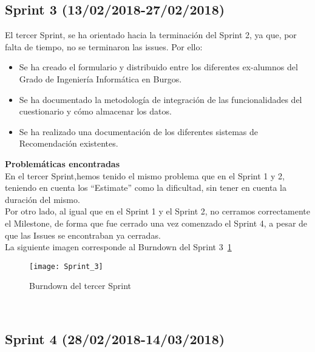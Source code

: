 \subsection{\textbf{Sprint 3}  (13/02/2018-27/02/2018) }
El tercer Sprint, se ha orientado hacia la terminación del Sprint 2, ya que, por falta de tiempo, no se terminaron las issues. 
Por ello: 
\begin{itemize}
\item Se ha creado el formulario y distribuido entre los diferentes ex-alumnos del Grado de Ingeniería Informática en Burgos. 
\item Se ha documentado la metodología de integración de las funcionalidades del cuestionario y cómo almacenar los datos. 
\item Se ha realizado una documentación de los diferentes sistemas de Recomendación existentes.  
\end{itemize}
\textbf{Problemáticas encontradas}\\En el tercer Sprint,hemos tenido el mismo problema que en el Sprint 1 y 2, teniendo en cuenta los ``Estimate'' como la dificultad, sin tener en cuenta la duración del mismo.\\Por otro lado, al igual que en el Sprint 1 y el Sprint 2, no cerramos correctamente el Milestone, de forma que fue cerrado una vez comenzado el Sprint 4, a pesar de que las Issues se encontraban ya cerradas. \\La siguiente imagen corresponde al Burndown del Sprint 3~\ref{fig:A.2.3}
\begin{figure}[h]
\centering
\texttt{[image: Sprint\_3]}
\caption{Burndown del tercer Sprint}
\label{fig:A.2.3}
\end{figure}
\\

\subsection{\textbf{Sprint 4}  (28/02/2018-14/03/2018) }



